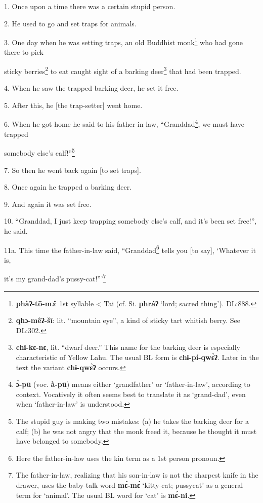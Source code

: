 \setcounter{footnote}{0}

1. Once upon a time there was a certain stupid person.

2. He used to go and set traps for animals.

3. One day when he was setting traps, an old Buddhist monk\footnote{\textbf{phàʔ-tō-mɔ̂}: 1st syllable < Tai (cf. Si. \textbf{phráʔ} `lord; sacred thing'). DL:888.} who had gone there
to pick

sticky berries\footnote{\textbf{qhɔ-mêʔ-šī}: lit. ``mountain eye'', a kind of sticky tart whitish berry. See DL:302.} to eat caught sight of a barking deer\footnote{\textbf{chɨ-kɛ-nɛ}, lit. ``dwarf deer.'' This name for the barking deer is especially characteristic of Yellow Lahu. The usual BL form is \textbf{chɨ-pí-qwɛ̀ʔ}. Later in the text the variant \textbf{chɨ-qwɛ̀ʔ} occurs.} that had been trapped.

4. When he saw the trapped barking deer, he set it free.

5. After this, he [the trap-setter] went home.

6. When he got home he said to his father-in-law, ``Granddad\footnote{\textbf{ɔ̀-pū} (voc. \textbf{à-pū}) means either `grandfather' or `father-in-law', according to context. Vocatively it often seems best to translate it as `grand-dad', even when `father-in-law' is understood.}, we must have
trapped

somebody else's calf!''\footnote{The stupid guy is making two mistakes: (a) he takes the barking deer for a calf; (b) he was not angry that the monk freed it, because he thought it must have belonged to somebody.}

7. So then he went back again [to set traps].

8. Once again he trapped a barking deer.

9. And again it was set free.

10. ``Granddad, I just keep trapping somebody else's calf, and it's been set free!'',
he said.

11a. This time the father-in-law said, ``Granddad\footnote{Here the father-in-law uses the kin term as a 1st person pronoun.} tells you [to say], `Whatever
it is,

it's my grand-dad's pussy-cat!'''\footnote{The father-in-law, realizing that his son-in-law is not the sharpest knife in the drawer, uses the baby-talk word \textbf{mɛ́-mɛ́} `kitty-cat; pussycat' as a general term for `animal'. The usual BL word for `cat' is \textbf{mɛ́-ni}.}

